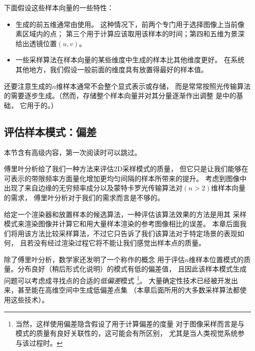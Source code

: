 下面假设这些样本向量的一些特性：
\begin{itemize}
    \item {}生成的前五维通常由使用。
          这种情况下，前两个专门用于选择图像上当前像素区域内的点；
          第三个用于计算应该取用该样本的时间；第四和五维为景深给出透镜位置$(u,v)$。
    \item 一些采样算法在样本向量的某些维度中生成的样本比其他维度更好。
          在系统其他地方，我们假设一般前面的维度具有放置得最好的样本值。
\end{itemize}

还要注意生成的$n$维样本通常不会整个显式表示或存储，
而是常常按照光传输算法的需要逐步生成。（然而，存储整个样本向量并对其分量逐渐作出调整
是中的基础，
它用于的。）

\subsection{评估样本模式：偏差}\label{sub:评价样本模式：偏差}
\begin{remark}
    本节含有高级内容，第一次阅读时可以跳过。
\end{remark}

傅里叶分析给了我们一种方法来评估2D采样模式的质量，
但它只是让我们能够在可表示的带限频率方面量化增加更均匀间隔的样本所带来的提升。
考虑到图像中出现了来自边缘的无穷频率成分以及蒙特卡罗光传输算法对$(n>2)$维样本向量的需求，
傅里叶分析对于我们的需求而言是不够的。

给定一个渲染器和放置样本的候选算法，一种评估该算法效果的方法是用其
采样模式来渲染图像并计算它和用大量样本渲染的参考图像相比的误差。
本章后面我们将用该方法比较采样算法，不过它只告诉了我们该算法对于特定场景的表现如何，
且若没有经过渲染过程它将不能让我们感觉出样本点的质量。

除了傅里叶分析，数学家还发明了一个称作的概念
用于评估$n$维样本位置模式的质量。分布良好（稍后形式化说明）的模式有低的偏差值，
且因此该样本模式生成问题可以考虑成寻找点的合适的\emph{低偏差}模式
\footnote{当然，这样使用偏差隐含假设了用于计算偏差的度量
    对于图像采样而言是与模式的质量有良好关联性的，这可能会有所区别，
    尤其是当人类视觉系统参与该过程时。}。
大量确定性技术已经被开发出来，甚至能在高维空间中生成低偏差点集
（本章后面所用的大多数采样算法都使用这些技术）。

